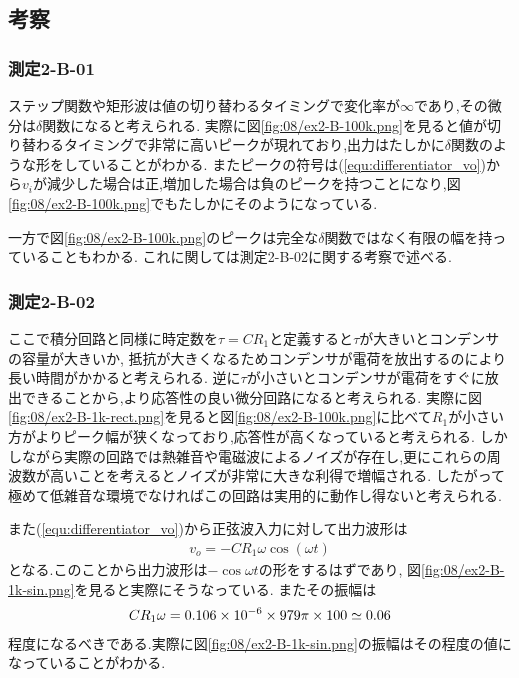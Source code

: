 \subsection{考察}
\subsubsection{測定2-B-01}
ステップ関数や矩形波は値の切り替わるタイミングで変化率が$\infty$であり,その微分は$\delta$関数になると考えられる.
実際に図\ref{fig:08/ex2-B-100k.png}を見ると値が切り替わるタイミングで非常に高いピークが現れており,出力はたしかに$\delta$関数のような形をしていることがわかる.
またピークの符号は(\ref{equ:differentiator_vo})から$v_i$が減少した場合は正,増加した場合は負のピークを持つことになり,図\ref{fig:08/ex2-B-100k.png}でもたしかにそのようになっている.

一方で図\ref{fig:08/ex2-B-100k.png}のピークは完全な$\delta$関数ではなく有限の幅を持っていることもわかる.
これに関しては測定2-B-02に関する考察で述べる.
\subsubsection{測定2-B-02}
ここで積分回路と同様に時定数を$\tau=CR_1$と定義すると$\tau$が大きいとコンデンサの容量が大きいか,
抵抗が大きくなるためコンデンサが電荷を放出するのにより長い時間がかかると考えられる.
逆に$\tau$が小さいとコンデンサが電荷をすぐに放出できることから,より応答性の良い微分回路になると考えられる.
実際に図\ref{fig:08/ex2-B-1k-rect.png}を見ると図\ref{fig:08/ex2-B-100k.png}に比べて$R_1$が小さい方がよりピーク幅が狭くなっており,応答性が高くなっていると考えられる.
しかしながら実際の回路では熱雑音や電磁波によるノイズが存在し,更にこれらの周波数が高いことを考えるとノイズが非常に大きな利得で増幅される.
したがって極めて低雑音な環境でなければこの回路は実用的に動作し得ないと考えられる.

また(\ref{equ:differentiator_vo})から正弦波入力に対して出力波形は
\begin{align}
  v_o=-CR_1\omega\cos(\omega t)
\end{align}
となる.このことから出力波形は$-\cos\omega t$の形をするはずであり,
図\ref{fig:08/ex2-B-1k-sin.png}を見ると実際にそうなっている.
またその振幅は
\begin{align}
  CR_1\omega=0.106\times10^{-6}\times979\time2\pi\times100\simeq0.06
\end{align}
程度になるべきである.実際に図\ref{fig:08/ex2-B-1k-sin.png}の振幅はその程度の値になっていることがわかる.

